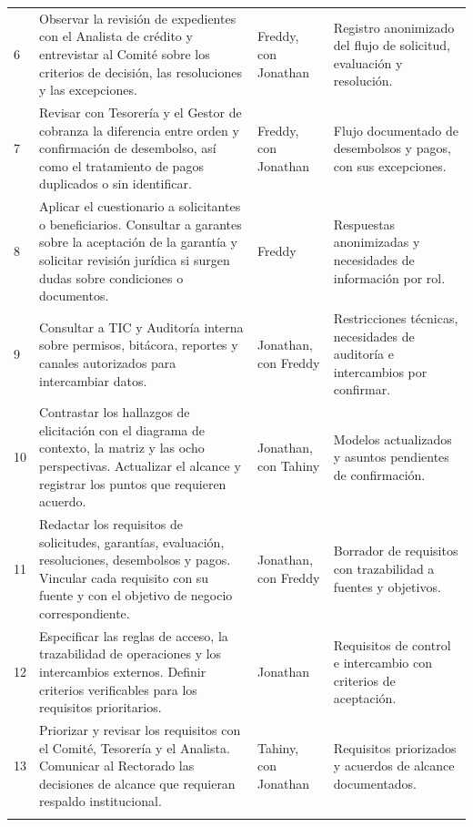 \documentclass[11pt,a4paper]{article}
\begin{document}
\begin{longtable}{@{}L{.09}L{.39}L{.14}L{.28}@{}}
6 & Observar la revisión de expedientes con el Analista de crédito
y entrevistar al Comité sobre los criterios de decisión,
las resoluciones y las excepciones.
& Freddy, con Jonathan
& Registro anonimizado del flujo de solicitud, evaluación y resolución. \\
\addlinespace

7 & Revisar con Tesorería y el Gestor de cobranza la diferencia
entre orden y confirmación de desembolso, así como el tratamiento
de pagos duplicados o sin identificar.
& Freddy, con Jonathan
& Flujo documentado de desembolsos y pagos, con sus excepciones. \\
\addlinespace

8 & Aplicar el cuestionario a solicitantes o beneficiarios.
Consultar a garantes sobre la aceptación de la garantía y solicitar
revisión jurídica si surgen dudas sobre condiciones o documentos.
& Freddy
& Respuestas anonimizadas y necesidades de información por rol. \\
\addlinespace

9 & Consultar a TIC y Auditoría interna sobre permisos, bitácora,
reportes y canales autorizados para intercambiar datos.
& Jonathan, con Freddy
& Restricciones técnicas, necesidades de auditoría e intercambios
por confirmar. \\
\addlinespace

10 & Contrastar los hallazgos de elicitación con el diagrama de
contexto, la matriz y las ocho perspectivas. Actualizar el alcance
y registrar los puntos que requieren acuerdo.
& Jonathan, con Tahiny
& Modelos actualizados y asuntos pendientes de confirmación. \\
\addlinespace

11 & Redactar los requisitos de solicitudes, garantías, evaluación,
resoluciones, desembolsos y pagos. Vincular cada requisito con su
fuente y con el objetivo de negocio correspondiente.
& Jonathan, con Freddy
& Borrador de requisitos con trazabilidad a fuentes y objetivos. \\
\addlinespace

12 & Especificar las reglas de acceso, la trazabilidad de operaciones
y los intercambios externos. Definir criterios verificables para
los requisitos prioritarios.
& Jonathan
& Requisitos de control e intercambio con criterios de aceptación. \\

13 & Priorizar y revisar los requisitos con el Comité, Tesorería
y el Analista. Comunicar al Rectorado las decisiones de alcance
que requieran respaldo institucional.
& Tahiny, con Jonathan
& Requisitos priorizados y acuerdos de alcance documentados. \\
\addlinespace


\end{longtable}
\end{document}
